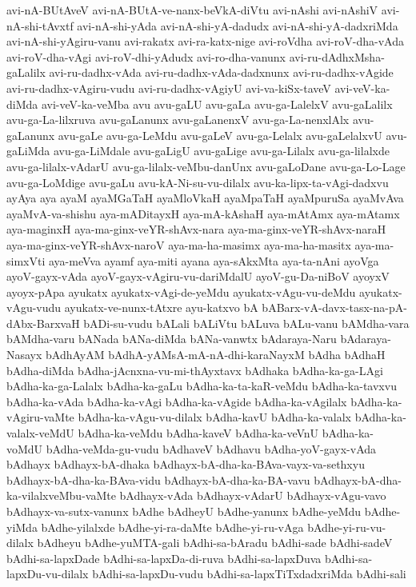 {avi-nA-BUtAveV
avi-nA-BUtA-ve-nanx-beVkA-diVtu
avi-nAshi
avi-nAshiV
avi-nA-shi-tAvxtf
avi-nA-shi-yAda
avi-nA-shi-yA-dadudx
avi-nA-shi-yA-dadxriMda
avi-nA-shi-yAgiru-vanu
avi-rakatx
avi-ra-katx-nige
avi-roVdha
avi-roV-dha-vAda
avi-roV-dha-vAgi
avi-roV-dhi-yAdudx
avi-ro-dha-vanunx
avi-ru-dAdhxMsha-gaLalilx
avi-ru-dadhx-vAda
avi-ru-dadhx-vAda-dadxnunx
avi-ru-dadhx-vAgide
avi-ru-dadhx-vAgiru-vudu
avi-ru-dadhx-vAgiyU
avi-va-kiSx-taveV
avi-veV-ka-diMda
avi-veV-ka-veMba
avu
avu-gaLU
avu-gaLa
avu-ga-LalelxV
avu-gaLalilx
avu-ga-La-lilxruva
avu-gaLanunx
avu-gaLanenxV
avu-ga-La-nenxlAlx
avu-gaLanunx
avu-gaLe
avu-ga-LeMdu
avu-gaLeV
avu-ga-Lelalx
avu-gaLelalxvU
avu-gaLiMda
avu-ga-LiMdale
avu-gaLigU
avu-gaLige
avu-ga-Lilalx
avu-ga-lilalxde
avu-ga-lilalx-vAdarU
avu-ga-lilalx-veMbu-danUnx
avu-gaLoDane
avu-ga-Lo-Lage
avu-ga-LoMdige
avu-gaLu
avu-kA-Ni-su-vu-dilalx
avu-ka-lipx-ta-vAgi-dadxvu
ayAya
aya
ayaM
ayaMGaTaH
ayaMloVkaH
ayaMpaTaH
ayaMpuruSa
ayaMvAva
ayaMvA-va-shishu
aya-mADitayxH
aya-mA-kAshaH
aya-mAtAmx
aya-mAtamx
aya-maginxH
aya-ma-ginx-veYR-shAvx-nara
aya-ma-ginx-veYR-shAvx-naraH
aya-ma-ginx-veYR-shAvx-naroV
aya-ma-ha-masimx
aya-ma-ha-masitx
aya-ma-simxVti
aya-meVva
ayamf
aya-miti
ayana
aya-sAkxMta
aya-ta-nAni
ayoVga
ayoV-gayx-vAda
ayoV-gayx-vAgiru-vu-dariMdalU
ayoV-gu-Da-niBoV
ayoyxV
ayoyx-pApa
ayukatx
ayukatx-vAgi-de-yeMdu
ayukatx-vAgu-vu-deMdu
ayukatx-vAgu-vudu
ayukatx-ve-nunx-tAtxre
ayu-katxvo
bA
bABarx-vA-davx-tasx-na-pA-dAbx-BarxvaH
bADi-su-vudu
bALali
bALiVtu
bALuva
bALu-vanu
bAMdha-vara
bAMdha-varu
bANada
bANa-diMda
bANa-vanwtx
bAdaraya-Naru
bAdaraya-Nasayx
bAdhAyAM
bAdhA-yAMsA-mA-nA-dhi-karaNayxM
bAdha
bAdhaH
bAdha-diMda
bAdha-jAcnxna-vu-mi-thAyxtavx
bAdhaka
bAdha-ka-ga-LAgi
bAdha-ka-ga-Lalalx
bAdha-ka-gaLu
bAdha-ka-ta-kaR-veMdu
bAdha-ka-tavxvu
bAdha-ka-vAda
bAdha-ka-vAgi
bAdha-ka-vAgide
bAdha-ka-vAgilalx
bAdha-ka-vAgiru-vaMte
bAdha-ka-vAgu-vu-dilalx
bAdha-kavU
bAdha-ka-valalx
bAdha-ka-valalx-veMdU
bAdha-ka-veMdu
bAdha-kaveV
bAdha-ka-veVnU
bAdha-ka-voMdU
bAdha-veMda-gu-vudu
bAdhaveV
bAdhavu
bAdha-yoV-gayx-vAda
bAdhayx
bAdhayx-bA-dhaka
bAdhayx-bA-dha-ka-BAva-vayx-va-sethxyu
bAdhayx-bA-dha-ka-BAva-vidu
bAdhayx-bA-dha-ka-BA-vavu
bAdhayx-bA-dha-ka-vilalxveMbu-vaMte
bAdhayx-vAda
bAdhayx-vAdarU
bAdhayx-vAgu-vavo
bAdhayx-va-sutx-vanunx
bAdhe
bAdheyU
bAdhe-yanunx
bAdhe-yeMdu
bAdhe-yiMda
bAdhe-yilalxde
bAdhe-yi-ra-daMte
bAdhe-yi-ru-vAga
bAdhe-yi-ru-vu-dilalx
bAdheyu
bAdhe-yuMTA-gali
bAdhi-sa-bAradu
bAdhi-sade
bAdhi-sadeV
bAdhi-sa-lapxDade
bAdhi-sa-lapxDa-di-ruva
bAdhi-sa-lapxDuva
bAdhi-sa-lapxDu-vu-dilalx
bAdhi-sa-lapxDu-vudu
bAdhi-sa-lapxTiTxdadxriMda
bAdhi-sali
}
